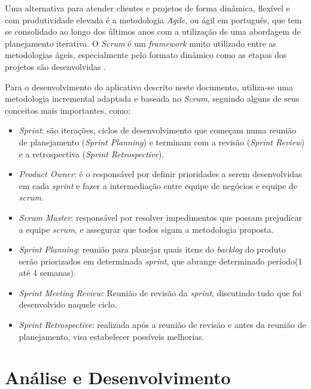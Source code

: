 Uma alternativa para atender clientes e projetos de forma din\^amica, flex\'ivel e com produtividade elevada \'e a metodologia \textit{Agile}, ou \'agil em portugu\^es, que tem se consolidado ao longo dos \'ultimos anos com a utiliza\c{c}\~ao de uma abordagem de planejamento iterativa. O \textit{Scrum} \'e um \textit{framework} muito utilizado entre as metodologias \'ageis, especialmente pelo formato din\^amico como as etapas dos projetos s\~ao desenvolvidas \cite{Udacity2017}. 

Para o desenvolvimento do aplicativo descrito neste documento, utiliza-se uma metodologia incremental adaptada e baseada no \textit{Scrum}, seguindo alguns de seus conceitos mais importantes, como: 

\begin{itemize}
	
	\item \textit{Sprint}: s\~ao itera\c{c}\~oes, ciclos de desenvolvimento que come\c{c}am numa reuni\~ao de planejamento (\textit{Sprint Planning}) e terminam com a revis\~ao (\textit{Sprint Review}) e a retrospectiva (\textit{Sprint Retrospective}).
	
	\item \textit{Product Owner}: \'e o respons\'avel por definir prioridades a serem desenvolvidas em cada \textit{sprint} e fazer a intermedia\c{c}\~ao entre equipe de neg\'ocios e equipe de \textit{scrum}.
	
	\item \textit{Scrum Master}: respons\'avel por resolver impedimentos que possam prejudicar a equipe \textit{scrum}, e assegurar que todos sigam a metodologia proposta. 
	
	\item \textit{Sprint Planning}: reuni\~ao para planejar quais itens do \textit{backlog} do produto ser\~ao priorizados em determinada \textit{sprint}, que abrange determinado per\'iodo(1 at\'e 4 semanas).
	
	\item  \textit{Sprint Meeting Review}: Reuni\~ao de revis\~ao da \textit{sprint}, discutindo tudo que foi desenvolvido naquele ciclo. 
	
	\item \textit{Sprint Retrospective}: realizada ap\'os a reuni\~ao de revis\~ao e antes da reuni\~ao de planejamento, visa estabelecer poss\'iveis melhorias. 
		
\end{itemize}


\section{An\'alise e Desenvolvimento}


